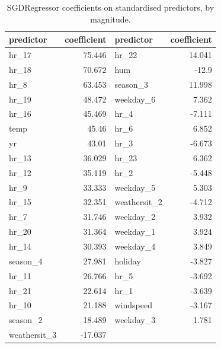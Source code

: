\begin{table}[htbp]
\centering
\caption{SGDRegressor coefficients on standardised predictors, by magnitude.}\label{tab:sgd-coefs}
\begin{tabular}{lr@{\hskip 2.5em}lr}
\toprule
predictor & coefficient & predictor & coefficient \\
\midrule
hr\_17 & 75.446 & hr\_22 & 14.041 \\
hr\_18 & 70.672 & hum & -12.9 \\
hr\_8 & 63.453 & season\_3 & 11.998 \\
hr\_19 & 48.472 & weekday\_6 & 7.362 \\
hr\_16 & 45.469 & hr\_4 & -7.111 \\
temp & 45.46 & hr\_6 & 6.852 \\
yr & 43.01 & hr\_3 & -6.673 \\
hr\_13 & 36.029 & hr\_23 & 6.362 \\
hr\_12 & 35.119 & hr\_2 & -5.448 \\
hr\_9 & 33.333 & weekday\_5 & 5.303 \\
hr\_15 & 32.351 & weathersit\_2 & -4.712 \\
hr\_7 & 31.746 & weekday\_2 & 3.932 \\
hr\_20 & 31.364 & weekday\_1 & 3.924 \\
hr\_14 & 30.393 & weekday\_4 & 3.849 \\
season\_4 & 27.981 & holiday & -3.827 \\
hr\_11 & 26.766 & hr\_5 & -3.692 \\
hr\_21 & 22.614 & hr\_1 & -3.639 \\
hr\_10 & 21.188 & windspeed & -3.167 \\
season\_2 & 18.489 & weekday\_3 & 1.781 \\
weathersit\_3 & -17.037 &  &  \\
\bottomrule
\end{tabular}
\end{table}

